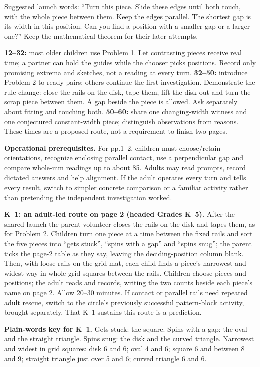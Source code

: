 \documentclass[11pt,letterpaper]{article}
\newcommand{\lead}[1]{\textbf{#1}}
\begin{document}
Suggested launch words: ``Turn this piece. Slide these edges until both touch, with the whole piece between them. Keep the edges parallel. The shortest gap is its width in this position. Can you find a position with a smaller gap or a larger one?'' Keep the mathematical theorem for their later attempts.

\lead{12--32:} most older children use Problem 1. Let contrasting pieces receive real time; a partner can hold the guides while the chooser picks positions. Record only promising extrema and sketches, not a reading at every turn. \lead{32--50:} introduce Problem 2 to ready pairs; others continue the first investigation. Demonstrate the rule change: close the rails on the disk, tape them, lift the disk out and turn the scrap piece between them. A gap beside the piece is allowed. Ask separately about fitting and touching both. \lead{50--60:} share one changing-width witness and one conjectured constant-width piece; distinguish observations from reasons. These times are a proposed route, not a requirement to finish two pages.

\lead{Operational prerequisites.} For pp.1--2, children must choose/retain orientations, recognize enclosing parallel contact, use a perpendicular gap and compare whole-mm readings up to about 85. Adults may read prompts, record dictated answers and help alignment. If the adult operates every turn and tells every result, switch to simpler concrete comparison or a familiar activity rather than pretending the independent investigation worked.

\lead{K--1: an adult-led route on page 2 (headed Grades K--5).} After the shared launch the parent volunteer closes the rails on the disk and tapes them, as for Problem 2. Children turn one piece at a time between the fixed rails and sort the five pieces into ``gets stuck'', ``spins with a gap'' and ``spins snug''; the parent ticks the page-2 table as they say, leaving the deciding-position column blank. Then, with loose rails on the grid mat, each child finds a piece's narrowest and widest way in whole grid squares between the rails. Children choose pieces and positions; the adult reads and records, writing the two counts beside each piece's name on page 2. Allow 20--30 minutes. If contact or parallel rails need repeated adult rescue, switch to the circle's previously successful pattern-block activity, brought separately. That K--1 sustains this route is a prediction.

\lead{Plain-words key for K--1.} Gets stuck: the square. Spins with a gap: the oval and the straight triangle. Spins snug: the disk and the curved triangle. Narrowest and widest in grid squares: disk 6 and 6; oval 4 and 6; square 6 and between 8 and 9; straight triangle just over 5 and 6; curved triangle 6 and 6.
\end{document}

